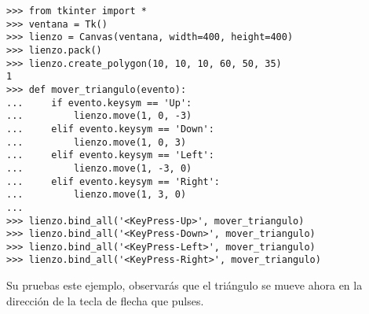 \begin{listingignore}
\begin{verbatim}
>>> from tkinter import *
>>> ventana = Tk()
>>> lienzo = Canvas(ventana, width=400, height=400)
>>> lienzo.pack()
>>> lienzo.create_polygon(10, 10, 10, 60, 50, 35)
1
>>> def mover_triangulo(evento):
...     if evento.keysym == 'Up':
...         lienzo.move(1, 0, -3)
...     elif evento.keysym == 'Down':
...         lienzo.move(1, 0, 3)
...     elif evento.keysym == 'Left':
...         lienzo.move(1, -3, 0)
...     elif evento.keysym == 'Right':
...         lienzo.move(1, 3, 0)
...
>>> lienzo.bind_all('<KeyPress-Up>', mover_triangulo)
>>> lienzo.bind_all('<KeyPress-Down>', mover_triangulo)
>>> lienzo.bind_all('<KeyPress-Left>', mover_triangulo)
>>> lienzo.bind_all('<KeyPress-Right>', mover_triangulo)
\end{verbatim}
\end{listingignore}

\noindent
Su pruebas este ejemplo, observarás que el triángulo se mueve ahora en la dirección de la tecla de flecha que pulses.

\newpage
